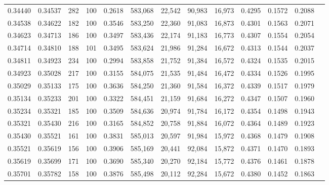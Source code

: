 \begin{tabular}{rrrrrrrrrrrrr}
0.34440 & 0.34537 &   282 & 100 &                                     0.2618 & 583,068 &  22,542 &  90,983 &  16,973 & 0.4295 & 0.1572 & 0.2088 \\
0.34538 & 0.34622 &   182 & 100 &                                     0.3546 & 583,250 &  22,360 &  91,083 &  16,873 & 0.4301 & 0.1563 & 0.2071 \\
0.34623 & 0.34713 &   186 & 100 &                                     0.3497 & 583,436 &  22,174 &  91,183 &  16,773 & 0.4307 & 0.1554 & 0.2054 \\
0.34714 & 0.34810 &   188 & 101 &                                     0.3495 & 583,624 &  21,986 &  91,284 &  16,672 & 0.4313 & 0.1544 & 0.2037 \\
0.34811 & 0.34923 &   234 & 100 &                                     0.2994 & 583,858 &  21,752 &  91,384 &  16,572 & 0.4324 & 0.1535 & 0.2015 \\
0.34923 & 0.35028 &   217 & 100 &                                     0.3155 & 584,075 &  21,535 &  91,484 &  16,472 & 0.4334 & 0.1526 & 0.1995 \\
0.35029 & 0.35133 &   175 & 100 &                                     0.3636 & 584,250 &  21,360 &  91,584 &  16,372 & 0.4339 & 0.1517 & 0.1979 \\
0.35134 & 0.35233 &   201 & 100 &                                     0.3322 & 584,451 &  21,159 &  91,684 &  16,272 & 0.4347 & 0.1507 & 0.1960 \\
0.35234 & 0.35321 &   185 & 100 &                                     0.3509 & 584,636 &  20,974 &  91,784 &  16,172 & 0.4354 & 0.1498 & 0.1943 \\
0.35321 & 0.35430 &   216 & 100 &                                     0.3165 & 584,852 &  20,758 &  91,884 &  16,072 & 0.4364 & 0.1489 & 0.1923 \\
0.35430 & 0.35521 &   161 & 100 &                                     0.3831 & 585,013 &  20,597 &  91,984 &  15,972 & 0.4368 & 0.1479 & 0.1908 \\
0.35521 & 0.35619 &   156 & 100 &                                     0.3906 & 585,169 &  20,441 &  92,084 &  15,872 & 0.4371 & 0.1470 & 0.1893 \\
0.35619 & 0.35699 &   171 & 100 &                                     0.3690 & 585,340 &  20,270 &  92,184 &  15,772 & 0.4376 & 0.1461 & 0.1878 \\
0.35701 & 0.35782 &   158 & 100 &                                     0.3876 & 585,498 &  20,112 &  92,284 &  15,672 & 0.4380 & 0.1452 & 0.1863 \\

\end{tabular}
